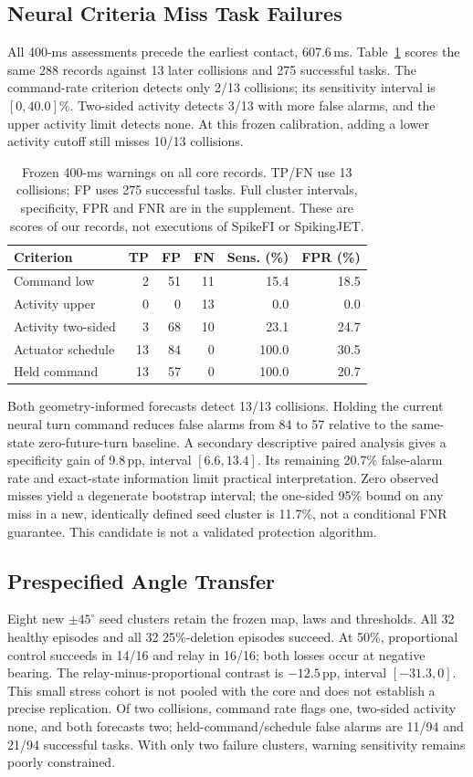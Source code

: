 \subsection{Neural Criteria Miss Task Failures}
All 400-ms assessments precede the earliest contact, 607.6\,ms. Table~\ref{tab:v9-warnings} scores the same 288 records against 13 later collisions and 275 successful tasks. The command-rate criterion detects only 2/13 collisions; its sensitivity interval is $[0,40.0]\%$. Two-sided activity detects 3/13 with more false alarms, and the upper activity limit detects none. At this frozen calibration, adding a lower activity cutoff still misses 10/13 collisions.

\begin{table}[t]
\caption{Frozen 400-ms warnings on all core records. TP/FN use 13 collisions; FP uses 275 successful tasks. Full cluster intervals, specificity, FPR and FNR are in the supplement. These are scores of our records, not executions of SpikeFI or SpikingJET.}
\label{tab:v9-warnings}
\centering
\begin{tabular}{lrrrrr}
\toprule
Criterion & TP & FP & FN & Sens. (\%) & FPR (\%)\\
\midrule
Command low & 2 & 51 & 11 & 15.4 & 18.5\\
Activity upper & 0 & 0 & 13 & 0.0 & 0.0\\
Activity two-sided & 3 & 68 & 10 & 23.1 & 24.7\\
Actuator schedule & 13 & 84 & 0 & 100.0 & 30.5\\
Held command & 13 & 57 & 0 & 100.0 & 20.7\\
\bottomrule
\end{tabular}
\end{table}

Both geometry-informed forecasts detect 13/13 collisions. Holding the current neural turn command reduces false alarms from 84 to 57 relative to the same-state zero-future-turn baseline. A secondary descriptive paired analysis gives a specificity gain of 9.8\,pp, interval $[6.6,13.4]$. Its remaining 20.7\% false-alarm rate and exact-state information limit practical interpretation. Zero observed misses yield a degenerate bootstrap interval; the one-sided 95\% bound on any miss in a new, identically defined seed cluster is 11.7\%, not a conditional FNR guarantee. This candidate is not a validated protection algorithm.

\subsection{Prespecified Angle Transfer}
Eight new $\pm45^\circ$ seed clusters retain the frozen map, laws and thresholds. All 32 healthy episodes and all 32 25\%-deletion episodes succeed. At 50\%, proportional control succeeds in 14/16 and relay in 16/16; both losses occur at negative bearing. The relay-minus-proportional contrast is $-12.5$\,pp, interval $[-31.3,0]$. This small stress cohort is not pooled with the core and does not establish a precise replication. Of two collisions, command rate flags one, two-sided activity none, and both forecasts two; held-command/schedule false alarms are 11/94 and 21/94 successful tasks. With only two failure clusters, warning sensitivity remains poorly constrained.

